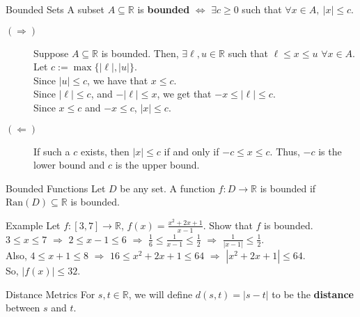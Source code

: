 \documentclass[8pt]{extarticle}
\newcommand{\ran}{\text{Ran}}
\newcommand{\R}{\mathbb{R}}
\begin{document}
  \begin{problem}{Bounded Sets}
    A subset $A\subseteq \R$ is \textbf{bounded} $\Leftrightarrow$  $\exists c \geq 0$ such that $\forall x\in A,~|x| \leq c$.
    \begin{description}
      \item[$(\Rightarrow)$] Suppose $A\subseteq \R$ is bounded. Then, $\exists \ell,u\in \R$ such that $\ell\leq x\leq u$ $\forall x\in A$. Let $c := \max\{|\ell|,|u|\}$.\\

        Since $|u| \leq c$, we have that $x\leq c$.\\

        Since $|\ell| \leq c$, and $-|\ell| \leq x$, we get that $-x \leq |\ell| \leq c$.\\

        Since $x\leq c$ and $-x\leq c$, $|x| \leq c$.
      \item[$(\Leftarrow)$] If such a $c$ exists, then $|x| \leq c$ if and only if $-c \leq x \leq c$. Thus, $-c$ is the lower bound and $c$ is the upper bound.
    \end{description}
    \begin{problem}{Bounded Functions}
      Let $D$ be any set. A function $f: D\rightarrow \R$ is bounded if $\ran(D)\subseteq \R$ is bounded.
    \end{problem}
    \begin{problem}{Example}
      Let $f: [3,7] \rightarrow \R$, $f(x) = \frac{x^2 + 2x + 1}{x-1}$. Show that $f$ is bounded.
      \tcblower
      $3\leq x \leq 7$ $\Rightarrow$ $2 \leq x-1 \leq 6$ $\Rightarrow$ $\frac{1}{6} \leq \frac{1}{x-1} \leq \frac{1}{2}$ $\Rightarrow$ $\frac{1}{|x-1|} \leq \frac{1}{2}$.\\

      Also, $4 \leq x+1 \leq 8$ $\Rightarrow$ $16 \leq x^2 + 2x + 1 \leq 64$ $\Rightarrow$ $|x^2 + 2x + 1| \leq 64$.\\

      So, $|f(x)| \leq 32$.
    \end{problem}
    \begin{problem}{Distance Metrics}
      For $s,t\in\R$, we will define $d(s,t) = |s-t|$ to be the \textbf{distance} between $s$ and $t$.


\end{problem}
\end{problem}
\end{document}
